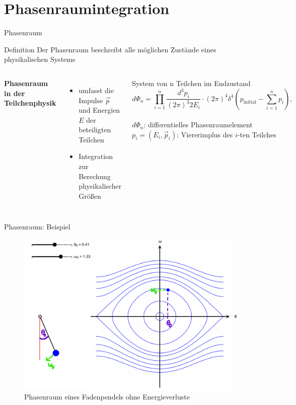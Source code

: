 \documentclass[aspectratio=169,xcolor=dvipsnames]{beamer}
\begin{document}
\section{Phasenraumintegration}
\begin{frame}{Phasenraum}
    \begin{block}{Definition}
        Der Phasenraum beschreibt alle möglichen Zustände eines physikalischen Systems
    \end{block}
    \vspace{10pt}
    \begin{columns}[c]
        \textbf{Phasenraum in der Teilchenphysik} \\
        \begin{itemize}
            \item umfasst die Impulse \( \vec{p} \) und Energien \( E \) der beteiligten Teilchen
            \item Integration zur Berechung physikalischer Größen
        \end{itemize}
        \pause
        \begin{exampleblock}{System von n Teilchen im Endzustand}
            \[
                d\Phi_n = \prod_{i=1}^n \frac{d^3p_i}{(2\pi)^3 2E_i} \cdot (2\pi)^4 \delta^4\left(p_{\text{initial}} - \sum_{i=1}^n p_i\right),
            \] \\
            \vspace{10pt}
            $d\Phi_n$: differentielles Phasenraumelement \\
            $p_i = (E_i, \overrightarrow{p}_i)$: Viererimplus des $i$-ten Teilches
        \end{exampleblock}
    \end{columns}
\end{frame}

\begin{frame}{Phasenraum: Beispiel}
    \begin{figure}
        \centering
        \includegraphics[width=0.55\linewidth]{figures/phasespace.png}
        \caption{Phasenraum eines Fadenpendels ohne Energieverluste}
        \label{fig:phasespace}
    \end{figure}
\end{frame}
\end{document}
